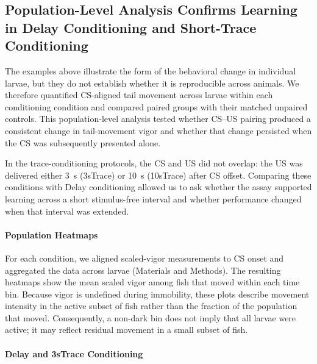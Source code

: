 \subsection{Population-Level Analysis Confirms Learning in Delay Conditioning and Short-Trace Conditioning}
The examples above illustrate the form of the behavioral change in individual larvae, but they do not establish whether it is reproducible across animals. We therefore quantified CS-aligned tail movement across larvae within each conditioning condition and compared paired groups with their matched unpaired controls. This population-level analysis tested whether CS--US pairing produced a consistent change in tail-movement vigor and whether that change persisted when the CS was subsequently presented alone.

In the trace-conditioning protocols, the CS and US did not overlap: the US was delivered either \SI{3}{\second} (3sTrace) or \SI{10}{\second} (10sTrace) after CS offset. Comparing these conditions with Delay conditioning allowed us to ask whether the assay supported learning across a short stimulus-free interval and whether performance changed when that interval was extended.

\paragraph{Population Heatmaps}

For each condition, we aligned scaled-vigor measurements to CS onset and aggregated the data across larvae (Materials and Methods). The resulting heatmaps show the mean scaled vigor among fish that moved within each time bin. Because vigor is undefined during immobility, these plots describe movement intensity in the active subset of fish rather than the fraction of the population that moved. Consequently, a non-dark bin does not imply that all larvae were active; it may reflect residual movement in a small subset of fish.

\paragraph{Delay and 3sTrace Conditioning}

